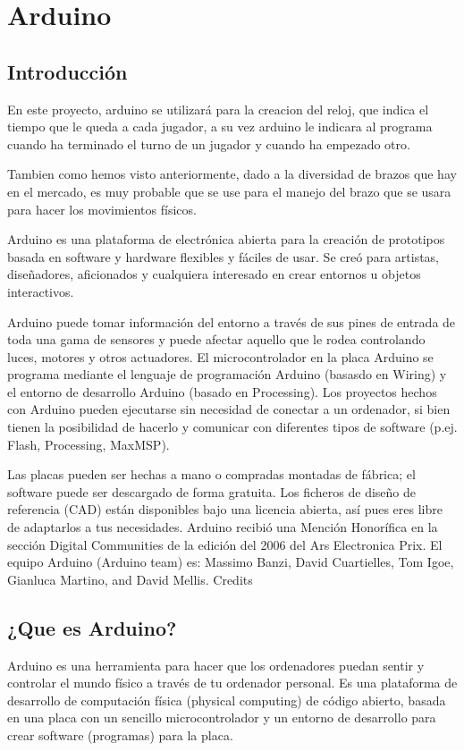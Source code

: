 \documentclass[12pt,a4paper]{report}
\begin{document}
\chapter{Arduino}
\section{Introducción}
En este proyecto, arduino se utilizará para la creacion del reloj, que indica el
tiempo que le queda a cada jugador, a su vez arduino le indicara al programa
cuando ha terminado el turno de un jugador y cuando ha empezado otro.

Tambien como hemos visto anteriormente, dado a la diversidad de brazos que hay
en el mercado, es muy probable que se use para el manejo del brazo que se usara
para hacer los movimientos físicos.

Arduino es una plataforma de electrónica abierta para la creación de prototipos
basada en software y hardware flexibles y fáciles de usar. Se creó para
artistas, diseñadores, aficionados y cualquiera interesado en crear entornos u
objetos interactivos.

Arduino puede tomar información del entorno a través de sus pines de entrada de
toda una gama de sensores y puede afectar aquello que le rodea controlando
luces, motores y otros actuadores. El microcontrolador en la placa Arduino se
programa mediante el lenguaje de programación Arduino (basasdo en Wiring) y el
entorno de desarrollo Arduino (basado en Processing). Los proyectos hechos con
Arduino pueden ejecutarse sin necesidad de conectar a un ordenador, si bien
tienen la posibilidad de hacerlo y comunicar con diferentes tipos de software
(p.ej. Flash, Processing, MaxMSP).

Las placas pueden ser hechas a mano o compradas montadas de fábrica; el software
puede ser descargado de forma gratuita. Los ficheros de diseño de referencia
(CAD) están disponibles bajo una licencia abierta, así pues eres libre de
adaptarlos a tus necesidades.
Arduino recibió una Mención Honorífica en la sección Digital Communities de la
edición del 2006 del Ars Electronica Prix. El equipo Arduino (Arduino team) es:
Massimo Banzi, David Cuartielles, Tom Igoe, Gianluca Martino, and David Mellis.
Credits

\section{¿Que es Arduino?}

Arduino es una herramienta para hacer que los ordenadores puedan sentir y
controlar el mundo físico a través de tu ordenador personal. Es una plataforma
de desarrollo de computación física (physical computing) de código abierto,
basada en una placa con un sencillo microcontrolador y un entorno de desarrollo
para crear software (programas) para la placa.
\end{document}
